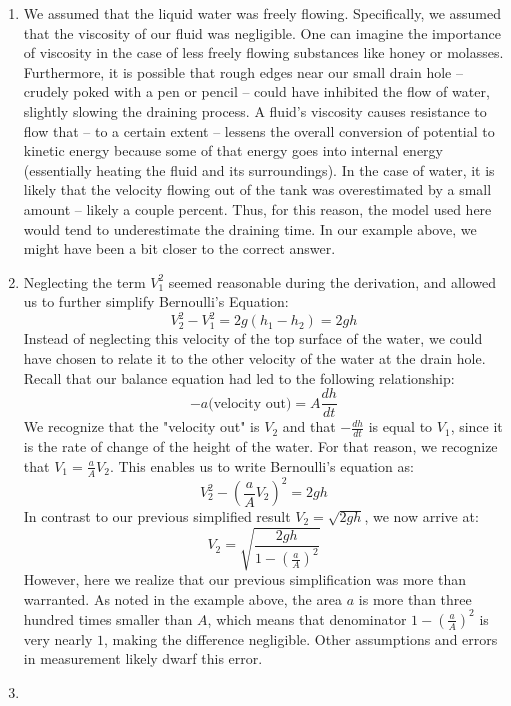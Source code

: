 \documentclass{ximera}
\begin{document}
\begin{enumerate}
    \item
    We assumed that the liquid water was freely flowing.  Specifically, we assumed that the viscosity of our fluid was negligible.  One can imagine the importance of viscosity in the case of less freely flowing substances like honey or molasses.  Furthermore, it is possible that rough edges near our small drain hole – crudely poked with a pen or pencil – could have inhibited the flow of water, slightly slowing the draining process.  A fluid’s viscosity causes resistance to flow that – to a certain extent – lessens the overall conversion of potential to kinetic energy because some of that energy goes into internal energy (essentially heating the fluid and its surroundings).  In the case of water, it is likely that the velocity flowing out of the tank was overestimated by a small amount – likely a couple percent.  Thus, for this reason, the model used here would tend to underestimate the draining time.  In our example above, we might have been a bit closer to the correct answer.
    \item
    Neglecting the term $V_1^2$ seemed reasonable during the derivation, and allowed us to further simplify Bernoulli’s Equation:
    $$V_2^2-V_1^2=2g(h_1-h_2)=2gh$$
    Instead of neglecting this velocity of the top surface of the water, we could have chosen to relate it to the other velocity of the water at the drain hole.  Recall that our balance equation had led to the following relationship:
    $$-a\mbox{(velocity out)}=A\frac{dh}{dt}$$
    We recognize that the "velocity out" is $V_2$ and that $-\frac{dh}{dt}$ is equal to $V_1$, since it is the rate of change of the height of the water.  For that reason, we recognize that $V_1=\frac{a}{A}V_2$.  This enables us to write Bernoulli's equation as:
    $$V_2^2-\left(\frac{a}{A}V_2\right)^2=2gh$$
    In contrast to our previous simplified result $V_2=\sqrt{2gh}$, we now arrive at:
    $$V_2=\sqrt{\frac{2gh}{1-\left(\frac{a}{A}\right)^2}}$$
    However, here we realize that our previous simplification was more than warranted.  As noted in the example above, the area $a$ is more than three hundred times smaller than $A$, which means that denominator $1-\left(\frac{a}{A}\right)^2$ is very nearly $1$, making the difference negligible.  Other assumptions and errors in measurement likely dwarf this error.
    \item

\end{enumerate}
\end{document}
